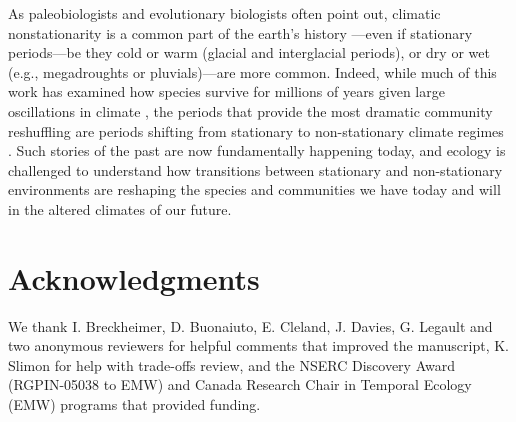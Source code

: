 \documentclass[11pt,letterpaper]{article}
\newcommand{\R}[1]{\label{#1}\linelabel{#1}}
\begin{document}
As paleobiologists and evolutionary biologists often point out, climatic nonstationarity is a common part of the earth's history \citep{Jansson:2002nz}---even if stationary periods---be they cold or warm (glacial and interglacial periods), or dry or wet (e.g., megadroughts or pluvials)\R{r2precip1}---are more common. Indeed, while much of this work has examined how species survive for millions of years given large oscillations in climate \citep{provan2008}, the periods that provide the most dramatic community reshuffling are periods shifting from stationary to non-stationary climate regimes \citep{vrba1980,vrba1985}. Such stories of the past are now fundamentally happening today, and ecology is challenged to understand how transitions between stationary and non-stationary environments are reshaping the species and communities we have today and will in the altered climates of our future.\R{r2precip2}


\section{Acknowledgments}
We thank I. Breckheimer, D. Buonaiuto, E. Cleland, J. Davies, G. Legault and two anonymous reviewers for helpful comments that improved the manuscript, K. Slimon for help with trade-offs review, and the NSERC Discovery Award (RGPIN-05038 to EMW) and Canada Research Chair in Temporal Ecology (EMW) programs that provided funding. 


\end{document}
